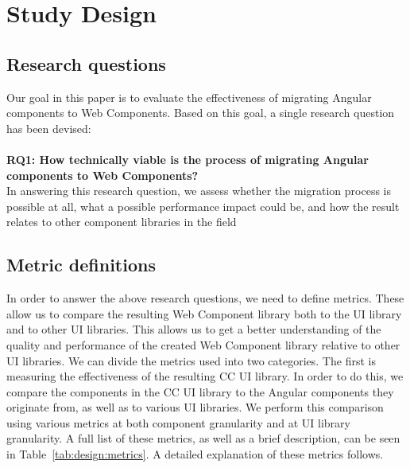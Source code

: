 \chapter{Study Design}\label{chap:design}

\section{Research questions}
Our goal in this paper is to evaluate the effectiveness of migrating Angular components to Web Components. Based on this goal, a single research question has been devised:
\\
\\
\textbf{RQ1: How technically viable is the process of migrating Angular components to Web Components?}
\\
In answering this research question, we assess whether the migration process is possible at all, what a possible performance impact could be, and how the result relates to other component libraries in the field
\\

\section{Metric definitions}
In order to answer the above research questions, we need to define metrics. These allow us to compare the resulting Web Component library both to the UI library and to other UI libraries. This allows us to get a better understanding of the quality and performance of the created Web Component library relative to other UI libraries. We can divide the metrics used into two categories. The first is measuring the effectiveness of the resulting CC UI library. In order to do this, we compare the components in the CC UI library to the Angular components they originate from, as well as to various UI libraries. We perform this comparison using various metrics at both component granularity and at UI library granularity. A full list of these metrics, as well as a brief description, can be seen in Table~\ref{tab:design:metrics}. A detailed explanation of these metrics follows.


